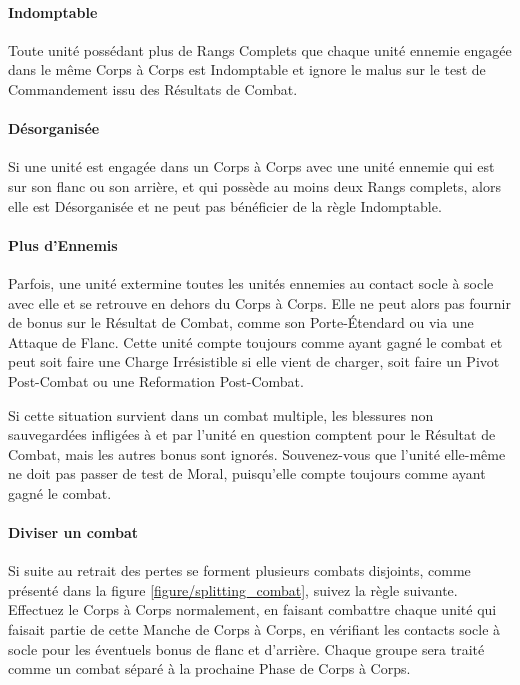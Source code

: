 \paragraph{Indomptable}

Toute unité possédant plus de Rangs Complets que chaque unité ennemie engagée dans le même Corps à Corps est Indomptable et ignore le malus sur le test de Commandement issu des Résultats de Combat.

\paragraph{Désorganisée}

Si une unité est engagée dans un Corps à Corps avec une unité ennemie qui est sur son flanc ou son arrière, et qui possède au moins deux Rangs complets, alors elle est Désorganisée et ne peut pas bénéficier de la règle Indomptable.

\paragraph{Plus d'Ennemis}

Parfois, une unité extermine toutes les unités ennemies au contact socle à socle avec elle et se retrouve en dehors du Corps à Corps. Elle ne peut alors pas fournir de bonus sur le Résultat de Combat, comme son Porte-Étendard ou via une Attaque de Flanc. Cette unité compte toujours comme ayant gagné le combat et peut soit faire une Charge Irrésistible si elle vient de charger, soit faire un Pivot Post-Combat ou une Reformation Post-Combat.

Si cette situation survient dans un combat multiple, les blessures non sauvegardées infligées à et par l'unité en question comptent pour le Résultat de Combat, mais les autres bonus sont ignorés. Souvenez-vous que l'unité elle-même ne doit pas passer de test de Moral, puisqu'elle compte toujours comme ayant gagné le combat.

\paragraph{Diviser un combat}

Si suite au retrait des pertes se forment plusieurs combats disjoints, comme présenté dans la figure \ref{figure/splitting_combat}, suivez la règle suivante. Effectuez le Corps à Corps normalement, en faisant combattre chaque unité qui faisait partie de cette Manche de Corps à Corps, en vérifiant les contacts socle à socle pour les éventuels bonus de flanc et d'arrière. Chaque groupe sera traité comme un combat séparé à la prochaine Phase de Corps à Corps.

